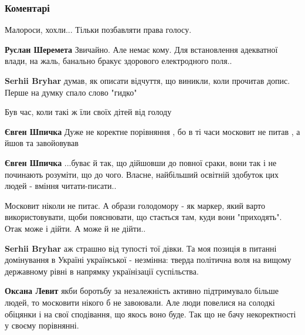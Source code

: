  
 
 
 
 
\subsubsection{Коментарі}

\begin{itemize} %
Малороси, хохли... Тільки позбавляти права голосу.

\begin{itemize} %
\textbf{Руслан Шеремета} Звичайно. Але немає кому. Для встановлення адекватної влади, на жаль, банально бракує здорового електродного поля..

\textbf{Serhii Bryhar} думав, як описати відчуття, що виникли, коли прочитав допис. Перше на думку спало слово "гидко"
\end{itemize} %

Був час, коли такі ж їли своїх дітей від голоду

\begin{itemize} %
\textbf{Євген Шпичка} Дуже не коректне порівняння , бо в ті часи московит не питав , а йшов та завойовував


\textbf{Євген Шпичка} ...буває й так, що дійшовши до повної сраки, вони так і не починають розуміти, що до чого. Власне, найбільший освітній здобуток цих людей - вміння читати-писати..


Московит ніколи не питає. А образи голодомору - як маркер, який варто використовувати, щоби пояснювати, що стається там, куди вони "приходять". Отак може і дійти. А може й не дійти..

\textbf{Serhii Bryhar} аж страшно від тупості тої дівки.
Та моя позиція в питанні домінування в Україні української - незмінна: тверда політична воля на вищому державному рівні в напрямку українізації суспільства.

\textbf{Оксана Левит} якби боротьбу за незалежність активно підтримувало більше людей, то московити нікого б не завоювали. Але люди повелися на солодкі обіцянки і на свої сподівання, що якось воно буде. Так що не бачу некоректності у своєму порівнянні.


\end{itemize}
\end{itemize}
